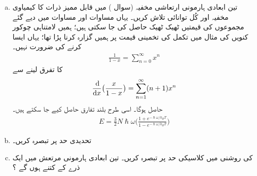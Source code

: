 \begin{enumerate}[a.]
\item
تین ابعادی ہارمونی ارتعاشی مخفیہ (سوال ) میں قابل ممیز ذرات کا کیمیاوی مخفیہ اور کُل توانائی تلاش کریں۔  یہاں مساوات  اور مساوات  میں دیے گئے مجموعوں کی قیمتیں ٹھیک ٹھیک حاصل کی جا سکتی ہیں؛ ہمیں لامتناہی چوکور کنویں کی مثال میں تکمل کی تخمینی قیمت پر ہمیں گزارہ کرنا پڑا تھا؛ یہاں ایسا کرنے کی ضرورت نہیں۔  
\begin{align}
\frac{1}{1 - x} = \sum_{n = 0}^{\infty} x^{n}
\end{align}
کا تفرق لینے سے 
\begin{align*}
\frac{\dif}{\dif x} \big ( \frac{x}{1 - x} \big ) = \sum_{n = 1}^{\infty} (n + 1) x^{n}
\end{align*}
حاصل ہوگا۔ اسی طرح بلند تفارق حاصل کیے جا سکتے ہیں۔  
\begin{align}
E = \frac{3}{2} N \hslash \omega \big ( \frac{1 + e^{- \hslash \omega / k_B T}}{1 - e^{- \hslash \omega / k_B T}} \big )
\end{align}
\item
تحدیدی حد  پر تبصرہ کریں۔
\item
{} کی روشنی میں کلاسیکی حد  پر تبصرہ کریں۔ تین ابعادی ہارمونی مرتعش میں ایک ذرے کے  کتنے ہوں گے ؟
\end{enumerate}

